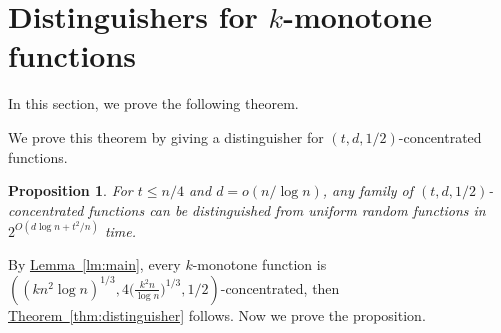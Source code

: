 \documentclass[11pt]{article}
\numberwithin{equation}{section}
\newtheorem{proposition}[theorem]{Proposition}
\theoremstyle{definition}
\theoremstyle{plain}
\newcommand{\expref}[2]{\hyperref[#2]{#1~\ref{#2}}}
\newcommand{\warn}[1]{#1}
\begin{document}
\section{Distinguishers for $k$-monotone functions}

In this section, we prove the following theorem.

\distinguisher*

We prove this theorem by giving a distinguisher for $(t,d,1/2)$-concentrated functions.

\begin{proposition}
For $t\leq n/4$ and $d=o(n/\log n)$, any family of $(t,d,1/2)$-concentrated functions can be distinguished from uniform random functions in
$2^{O(d\log n + t^2/n)}$ time.
\end{proposition}

By \expref{Lemma}{lm:main}, every $k$-monotone function is \warn{ $\left((kn^2\log{n})^{1/3},4\big(\frac{k^2n}{\log n}\big)^{1/3},1/2\right)$}-concentrated, then \expref{Theorem}{thm:distinguisher} follows. Now we prove the proposition.
\end{document}
